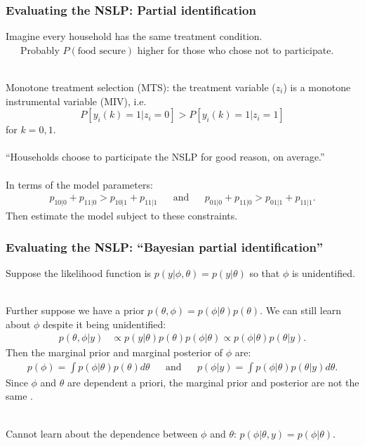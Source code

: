 \documentclass[xcolor=dvipsnames]{beamer}
\begin{document}
\begin{frame}
\frametitle{Evaluating the NSLP: Partial identification}
Imagine every household has the same treatment condition.\\
\ \ \ Probably $P(\mbox{food secure})$ higher for those who chose not to participate.\\~

\pause Monotone treatment selection (MTS): the treatment variable ($z_i$) is a monotone instrumental variable (MIV), i.e.
\[
P[y_i(k)=1|z_i=0] > P[y_i(k)=1|z_i=1]
\]
for $k=0,1$.\\~\\

``Households choose to participate the NSLP for good reason, on average.''\\~\\

\pause In terms of the model parameters:
\begin{align*}
  p_{10|0} + p_{11|0} > p_{10|1} + p_{11|1} &&\mbox{and}&&  p_{01|0} + p_{11|0} > p_{01|1} + p_{11|1}.
\end{align*}
\pause Then estimate the model subject to these constraints.
\end{frame}


\begin{frame}
\frametitle{Evaluating the NSLP: ``Bayesian partial identification''}
Suppose the likelihood function is $p(y|\phi,\theta)=p(y|\theta)$ so that $\phi$ is unidentified.\\~

Further suppose we have a prior $p(\theta,\phi)=p(\phi|\theta)p(\theta)$. \pause We can still learn about $\phi$ despite it being unidentified:
    \begin{align*}
    p(\theta,\phi|y) &\propto p(y|\theta)p(\theta)p(\phi|\theta) \propto p(\phi|\theta)p(\theta|y).
  \end{align*}
\pause Then the marginal prior and marginal posterior of $\phi$ are:
    \begin{align*}
    p(\phi) = \int p(\phi|\theta)p(\theta)d\theta  &&\mbox{and}&& p(\phi|y) = \int p(\phi|\theta)p(\theta|y)d\theta.
  \end{align*}
Since $\phi$ and $\theta$ are dependent a priori, the marginal prior and posterior are not the same \citep{poirier1998revising}.\\~

\pause Cannot learn about the dependence between $\phi$ and $\theta$: $p(\phi|\theta,y)=p(\phi|\theta)$.

\end{frame}
\end{document}

